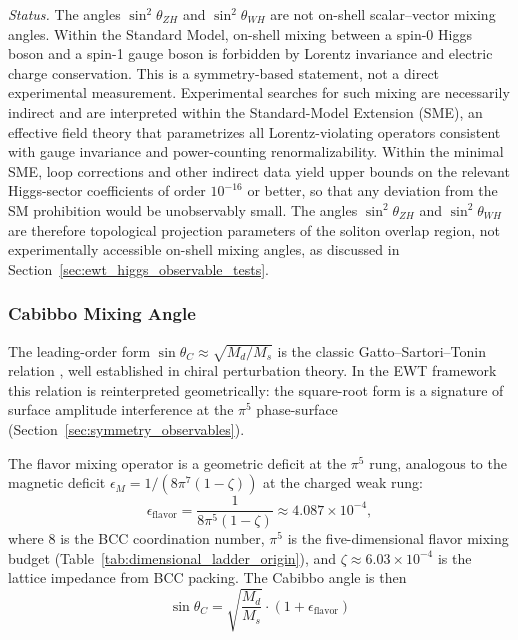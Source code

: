\documentclass[10pt,a4paper]{article}
\begin{document}
\emph{Status.} The angles $\sin^2\theta_{ZH}$ and $\sin^2\theta_{WH}$
are not on-shell scalar--vector mixing angles. Within the Standard
Model, on-shell mixing between a spin-0 Higgs boson and a spin-1
gauge boson is forbidden by Lorentz invariance and electric charge
conservation. This is a symmetry-based statement, not a direct
experimental measurement. Experimental searches for such mixing are
necessarily indirect and are interpreted within the Standard-Model
Extension (SME), an effective field theory that parametrizes all
Lorentz-violating operators consistent with gauge invariance and
power-counting renormalizability. Within the minimal SME, loop
corrections and other indirect data yield upper bounds on the
relevant Higgs-sector coefficients of order $10^{-16}$ or better,
so that any deviation from the SM prohibition would be
unobservably small. The angles $\sin^2\theta_{ZH}$ and
$\sin^2\theta_{WH}$ are therefore topological projection parameters
of the soliton overlap region, not experimentally accessible
on-shell mixing angles, as discussed in
Section~\ref{sec:ewt_higgs_observable_tests}.

\subsubsection{Cabibbo Mixing Angle}

The leading-order form $\sin\theta_C \approx \sqrt{M_d/M_s}$ is the
classic Gatto--Sartori--Tonin relation \cite{Gatto1968}, well
established in chiral perturbation theory. In the EWT framework this
relation is reinterpreted geometrically: the square-root form is a
signature of surface amplitude interference at the $\pi^5$
phase-surface (Section~\ref{sec:symmetry_observables}).

The flavor mixing operator is a geometric deficit at the $\pi^5$ rung,
analogous to the magnetic deficit $\epsilon_M = 1/(8\pi^7(1-\zeta))$
at the charged weak rung:
\begin{equation}
	\epsilon_{\text{flavor}}
	= \frac{1}{8\pi^5(1-\zeta)}
	\approx 4.087 \times 10^{-4},
	\label{eq:eps_flavor_cabibbo}
\end{equation}
where $8$ is the BCC coordination number, $\pi^5$ is the
five-dimensional flavor mixing budget
(Table~\ref{tab:dimensional_ladder_origin}), and $\zeta \approx
6.03 \times 10^{-4}$ is the lattice impedance from BCC packing. The
Cabibbo angle is then
\begin{equation}
	\boxed{
		\sin\theta_C
		= \sqrt{\frac{M_d}{M_s}}
		\cdot \left(1 + \epsilon_{\text{flavor}}\right)
	}
	\label{eq:cabibbo_ewt}
\end{equation}
\end{document}
